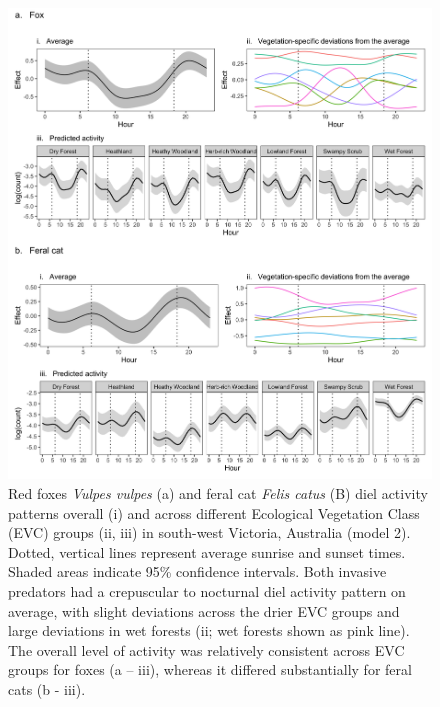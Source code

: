 \documentclass[11pt,a4paper,titlepage,twoside,openright]{style/unimelbthesis}
\begin{document}
\begin{mainmatter}
\begin{figure}
{\centering \includegraphics[width=1\linewidth]{figure/predator_veg} 

}

\caption{Red foxes \textit{Vulpes vulpes} (a) and feral cat \textit{Felis catus} (B) diel activity patterns overall (i) and across different Ecological Vegetation Class (EVC) groups (ii, iii) in south-west Victoria, Australia (model 2). Dotted, vertical lines represent average sunrise and sunset times. Shaded areas indicate 95\% confidence intervals. Both invasive predators had a crepuscular to nocturnal diel activity pattern on average, with slight deviations across the drier EVC groups and large deviations in wet forests (ii; wet forests shown as pink line). The overall level of activity was relatively consistent across EVC groups for foxes (a – iii), whereas it differed substantially for feral cats (b - iii).}\label{fig:diel-veg}
\end{figure}
\newpage
\begin{figure}


\end{figure}
\end{mainmatter}
\end{document}
